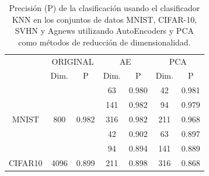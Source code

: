 \begin{table}[]
\centering
\caption{Precisión (P) de la clasificación usando el clasificador KNN  en los conjuntos de datos  MNIST, CIFAR-10, SVHN y Agnews  utilizando  AutoEncoders y PCA como métodos de reducción de dimensionalidad.}
\label{table-result}
\begin{tabular}{c|cc|cccc|}
\cline{2-7}
\multicolumn{1}{l|}{}                           & \multicolumn{2}{c|}{ORIGINAL}                                               & \multicolumn{2}{c|}{AE}                                                       & \multicolumn{2}{c|}{PCA}                                  \\ \cline{2-7} 
\multicolumn{1}{l|}{}                           & \multicolumn{1}{c|}{\cellcolor[HTML]{E6E6E6}Dim.} & P                    & \multicolumn{1}{c|}{\cellcolor[HTML]{E6E6E6}Dim.} & \multicolumn{1}{c|}{P} & \multicolumn{1}{c|}{\cellcolor[HTML]{E6E6E6}Dim.} & P  \\ \hline
\multicolumn{1}{|c|}{}                          & \cellcolor[HTML]{E6E6E6}                          &                         & \cellcolor[HTML]{E6E6E6}63                        & 0.980                     & \cellcolor[HTML]{E6E6E6}42                        & 0.981 \\
\multicolumn{1}{|c|}{}                          & \cellcolor[HTML]{E6E6E6}                          &                         & \cellcolor[HTML]{E6E6E6}141                       & 0.982                     & \cellcolor[HTML]{E6E6E6}94                        & 0.979 \\
\multicolumn{1}{|c|}{\multirow{-3}{*}{MNIST}}   & \multirow{-3}{*}{\cellcolor[HTML]{E6E6E6}800}     & \multirow{-3}{*}{0.982} & \cellcolor[HTML]{E6E6E6}316                       & 0.982                     & \cellcolor[HTML]{E6E6E6}211                       & 0.968 \\ \hline
\multicolumn{1}{|c|}{}                          & \cellcolor[HTML]{E6E6E6}                          &                         & \cellcolor[HTML]{E6E6E6}42                        & 0.902                     & \cellcolor[HTML]{E6E6E6}63                        & 0.897 \\
\multicolumn{1}{|c|}{}                          & \cellcolor[HTML]{E6E6E6}                          &                         & \cellcolor[HTML]{E6E6E6}94                        & 0.894                     & \cellcolor[HTML]{E6E6E6}141                       & 0.889 \\
\multicolumn{1}{|c|}{\multirow{-3}{*}{CIFAR10}} & \multirow{-3}{*}{\cellcolor[HTML]{E6E6E6}4096}    & \multirow{-3}{*}{0.899} & \cellcolor[HTML]{E6E6E6}211                       & 0.898                     & \cellcolor[HTML]{E6E6E6}316                       & 0.868 \\ \hline

\end{tabular}
\end{table}

